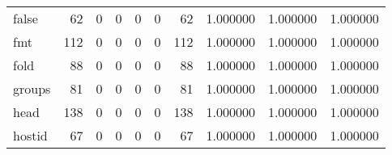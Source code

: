 \begin{tabular}{lrrrrrrrrr}
false     &                                    62 &                                                  0 &                                                  0 &                                                  0 &                                                  0 &                                                 62 &                                           1.000000 &                               1.000000 &                             1.000000 \\
fmt       &                                   112 &                                                  0 &                                                  0 &                                                  0 &                                                  0 &                                                112 &                                           1.000000 &                               1.000000 &                             1.000000 \\
fold      &                                    88 &                                                  0 &                                                  0 &                                                  0 &                                                  0 &                                                 88 &                                           1.000000 &                               1.000000 &                             1.000000 \\
groups    &                                    81 &                                                  0 &                                                  0 &                                                  0 &                                                  0 &                                                 81 &                                           1.000000 &                               1.000000 &                             1.000000 \\
head      &                                   138 &                                                  0 &                                                  0 &                                                  0 &                                                  0 &                                                138 &                                           1.000000 &                               1.000000 &                             1.000000 \\
hostid    &                                    67 &                                                  0 &                                                  0 &                                                  0 &                                                  0 &                                                 67 &                                           1.000000 &                               1.000000 &                             1.000000 \\

\end{tabular}
